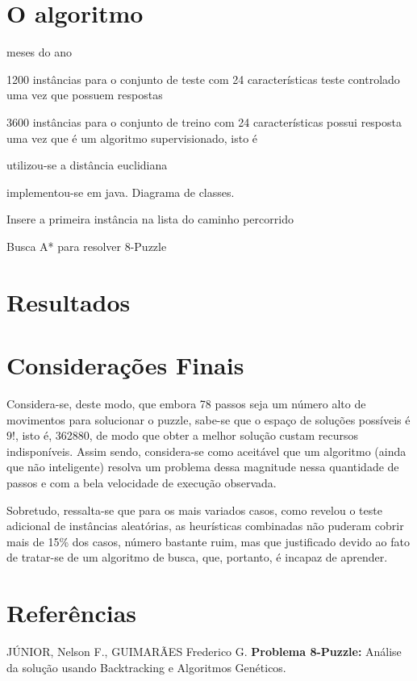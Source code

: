 \documentclass[12pt]{article}
\begin{document}
	\section{O algoritmo}\label{sec:algoritmo}


		meses do ano

		1200 instâncias para o conjunto de teste com 24 características
		teste controlado uma vez que possuem respostas

		3600 instâncias para o conjunto de treino com 24 características
		possui resposta uma vez que é um algoritmo supervisionado, isto é

		utilizou-se a distância euclidiana

		implementou-se em java.
		Diagrama de classes.


		\begin{algorithm}[H]
			Insere a primeira instância na lista do caminho percorrido\;
			\caption{Busca A* para resolver 8-Puzzle}
		\end{algorithm}



	\section{Resultados}\label{sec:resultados}

	

	\section{Considerações Finais}\label{sec:consideracoesFinais}

		Considera-se, deste modo, que embora 78 passos seja um número alto de movimentos para solucionar o puzzle, sabe-se que o espaço de soluções possíveis é $9!$, isto é, 362880, de modo que obter a melhor solução custam recursos indisponíveis. Assim sendo, considera-se como aceitável que um algoritmo (ainda que não inteligente) resolva um problema dessa magnitude nessa quantidade de passos e com a bela velocidade de execução observada.

		Sobretudo, ressalta-se que para os mais variados casos, como revelou o teste adicional de instâncias aleatórias, as heurísticas combinadas não puderam cobrir mais de 15\% dos casos, número bastante ruim, mas que justificado devido ao fato de tratar-se de um algoritmo de busca, que, portanto, é incapaz de aprender.

	\section{Referências}\label{sec:referencias}

		JÚNIOR, Nelson F., GUIMARÃES Frederico G. \textbf{Problema 8-Puzzle:} Análise da solução usando Backtracking e Algoritmos Genéticos.
\end{document}
